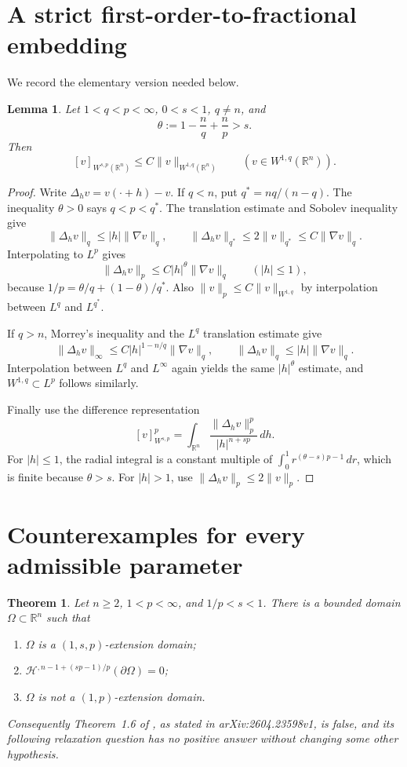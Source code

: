 \documentclass[11pt,a4paper]{article}
\newtheorem{theorem}{Theorem}
\newtheorem{lemma}{Lemma}
\newcommand{\R}{\mathbb R}
\newcommand{\Om}{\Omega}
\newcommand{\Hs}{\mathcal H}
\begin{document}
\section{A strict first-order-to-fractional embedding}

We record the elementary version needed below.

\begin{lemma}\label{lem:embedding}
Let $1<q<p<\infty$, $0<s<1$, $q\ne n$, and
\[
  \theta:=1-\frac nq+\frac np>s.
\]
Then
\[
 [v]_{W^{s,p}(\R^n)}\le C\|v\|_{W^{1,q}(\R^n)}
 \qquad(v\in W^{1,q}(\R^n)).
\]
\end{lemma}

\begin{proof}
Write $\Delta_hv=v(\cdot+h)-v$. If $q<n$, put
$q^*=nq/(n-q)$. The inequality $\theta>0$ says $q<p<q^*$.
The translation estimate and Sobolev inequality give
\[
 \|\Delta_hv\|_q\le |h|\|\nabla v\|_q,
 \qquad
 \|\Delta_hv\|_{q^*}\le 2\|v\|_{q^*}
 \le C\|\nabla v\|_q.
\]
Interpolating to $L^p$ gives
\[
 \|\Delta_hv\|_p\le C|h|^\theta\|\nabla v\|_q
 \qquad (|h|\le1),
\]
because $1/p=\theta/q+(1-\theta)/q^*$. Also
$\|v\|_p\le C\|v\|_{W^{1,q}}$ by interpolation between $L^q$ and
$L^{q^*}$.

If $q>n$, Morrey's inequality and the $L^q$ translation estimate give
\[
 \|\Delta_hv\|_\infty
 \le C|h|^{1-n/q}\|\nabla v\|_q,
 \qquad
 \|\Delta_hv\|_q\le |h|\|\nabla v\|_q.
\]
Interpolation between $L^q$ and $L^\infty$ again yields the same
$|h|^\theta$ estimate, and $W^{1,q}\subset L^p$ follows similarly.

Finally use the difference representation
\[
 [v]_{W^{s,p}}^p
 =\int_{\R^n}\frac{\|\Delta_hv\|_p^p}{|h|^{n+sp}}\,dh.
\]
For $|h|\le1$, the radial integral is a constant multiple of
$\int_0^1 r^{(\theta-s)p-1}\,dr$, which is finite because $\theta>s$.
For $|h|>1$, use $\|\Delta_hv\|_p\le2\|v\|_p$.
\end{proof}

\section{Counterexamples for every admissible parameter}

\begin{theorem}\label{thm:main}
Let $n\ge2$, $1<p<\infty$, and $1/p<s<1$. There is a bounded domain
$\Om\subset\R^n$ such that
\begin{enumerate}
 \item $\Om$ is a $(1,s,p)$-extension domain;
 \item $\Hs^{,n-1+(sp-1)/p}(\partial\Om)=0$;
 \item $\Om$ is not a $(1,p)$-extension domain.
\end{enumerate}
Consequently Theorem~1.6 of \cite{MM}, as stated in arXiv:2604.23598v1,
is false, and its following relaxation question has no positive answer without
changing some other hypothesis.
\end{theorem}
\end{document}
